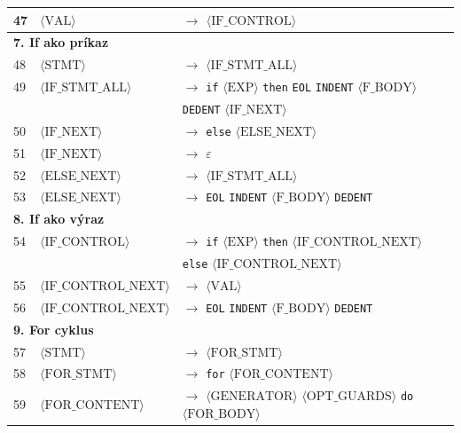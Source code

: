\begin{longtable}{l l l}
47 & $\langle\text{VAL}\rangle$ & $\rightarrow$ $\langle\text{IF\_CONTROL}\rangle$ \\
\midrule
\multicolumn{3}{l}{\textbf{7. If ako príkaz}} \\[2pt]
48 & $\langle\text{STMT}\rangle$ & $\rightarrow$ $\langle\text{IF\_STMT\_ALL}\rangle$ \\
49 & $\langle\text{IF\_STMT\_ALL}\rangle$ & $\rightarrow$ \texttt{if} $\langle\text{EXP}\rangle$ \texttt{then} \texttt{EOL} \texttt{INDENT} $\langle\text{F\_BODY}\rangle$ \\
 & & \hspace{1.2em}\texttt{DEDENT} $\langle\text{IF\_NEXT}\rangle$ \\
50 & $\langle\text{IF\_NEXT}\rangle$ & $\rightarrow$ \texttt{else} $\langle\text{ELSE\_NEXT}\rangle$ \\
51 & $\langle\text{IF\_NEXT}\rangle$ & $\rightarrow$ $\varepsilon$ \\
52 & $\langle\text{ELSE\_NEXT}\rangle$ & $\rightarrow$ $\langle\text{IF\_STMT\_ALL}\rangle$ \\
53 & $\langle\text{ELSE\_NEXT}\rangle$ & $\rightarrow$ \texttt{EOL} \texttt{INDENT} $\langle\text{F\_BODY}\rangle$ \texttt{DEDENT} \\
\midrule
\multicolumn{3}{l}{\textbf{8. If ako výraz}} \\[2pt]
54 & $\langle\text{IF\_CONTROL}\rangle$ & $\rightarrow$ \texttt{if} $\langle\text{EXP}\rangle$ \texttt{then} $\langle\text{IF\_CONTROL\_NEXT}\rangle$ \\
 & & \hspace{1.2em}\texttt{else} $\langle\text{IF\_CONTROL\_NEXT}\rangle$ \\
55 & $\langle\text{IF\_CONTROL\_NEXT}\rangle$ & $\rightarrow$ $\langle\text{VAL}\rangle$ \\
56 & $\langle\text{IF\_CONTROL\_NEXT}\rangle$ & $\rightarrow$ \texttt{EOL} \texttt{INDENT} $\langle\text{F\_BODY}\rangle$ \texttt{DEDENT} \\
\midrule
\multicolumn{3}{l}{\textbf{9. For cyklus}} \\[2pt]
57 & $\langle\text{STMT}\rangle$ & $\rightarrow$ $\langle\text{FOR\_STMT}\rangle$ \\
58 & $\langle\text{FOR\_STMT}\rangle$ & $\rightarrow$ \texttt{for} $\langle\text{FOR\_CONTENT}\rangle$ \\
59 & $\langle\text{FOR\_CONTENT}\rangle$ & $\rightarrow$ $\langle\text{GENERATOR}\rangle$ $\langle\text{OPT\_GUARDS}\rangle$ \texttt{do} $\langle\text{FOR\_BODY}\rangle$ \\

\end{longtable}
